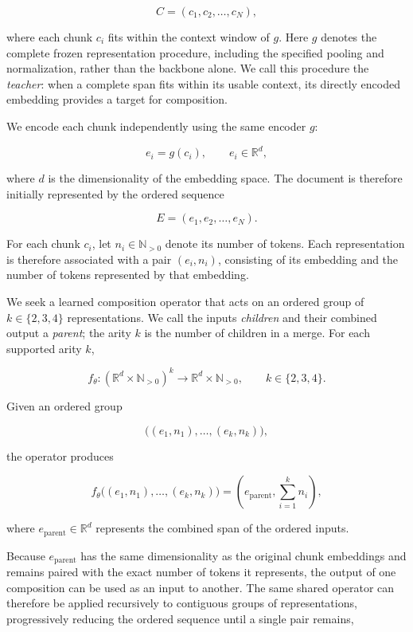 \documentclass[10pt]{article}
\begin{document}
\[
C = (c_1, c_2, \ldots, c_N),
\]

where each chunk \(c_i\) fits within the context window of \(g\). Here
\(g\) denotes the complete frozen representation procedure, including the
specified pooling and normalization, rather than the backbone alone. We call
this procedure the \emph{teacher}: when a complete span fits within its usable
context, its directly encoded embedding provides a target for composition.

We encode each chunk independently using the same encoder \(g\):

\[
e_i = g(c_i), \qquad e_i \in \mathbb{R}^d,
\]

where \(d\) is the dimensionality of the embedding space. The document is therefore initially represented by the ordered sequence

\[
E = (e_1, e_2, \ldots, e_N).
\]

For each chunk \(c_i\), let \(n_i \in \mathbb{N}_{>0}\) denote its number of tokens. Each representation is therefore associated with a pair \((e_i,n_i)\), consisting of its embedding and the number of tokens represented by that embedding.

We seek a learned composition operator that acts on an ordered group of \(k\in\{2,3,4\}\) representations. We call the inputs \emph{children} and their combined output a \emph{parent}; the arity \(k\) is the number of children in a merge. For each supported arity \(k\),

\[
f_\theta :
(\mathbb{R}^d \times \mathbb{N}_{>0})^k
\rightarrow
\mathbb{R}^d \times \mathbb{N}_{>0},
\qquad
k\in\{2,3,4\}.
\]

Given an ordered group

\[
\big((e_1,n_1),\ldots,(e_k,n_k)\big),
\]

the operator produces

\[
f_\theta\big((e_1,n_1),\ldots,(e_k,n_k)\big)
=
\left(
e_{\mathrm{parent}},
\sum_{i=1}^{k}n_i
\right),
\]

where \(e_{\mathrm{parent}}\in\mathbb{R}^d\) represents the combined span of the ordered inputs.

Because \(e_{\mathrm{parent}}\) has the same dimensionality as the original chunk embeddings and remains paired with the exact number of tokens it represents, the output of one composition can be used as an input to another. The same shared operator can therefore be applied recursively to contiguous groups of representations, progressively reducing the ordered sequence until a single pair remains,
\end{document}
